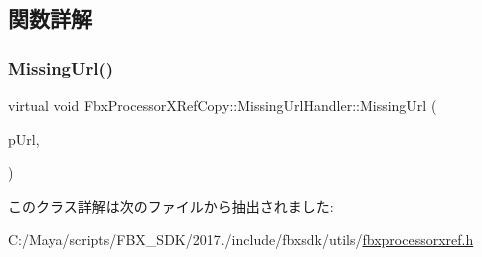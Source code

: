 \subsection{関数詳解}
\mbox{\label{class_fbx_processor_x_ref_copy_1_1_missing_url_handler_aa1ccc43ba9aecf2345e282e63bf722f2}} 
\subsubsection{\texorpdfstring{Missing\+Url()}{MissingUrl()}}
{\footnotesize\ttfamily virtual void Fbx\+Processor\+X\+Ref\+Copy\+::\+Missing\+Url\+Handler\+::\+Missing\+Url (\begin{DoxyParamCaption}\item[{const \hyperlink{class_fbx_string}{Fbx\+String} \&}]{p\+Url,  }\item[{const \hyperlink{class_fbx_property}{Fbx\+Property} \&}]{ }\end{DoxyParamCaption})\hspace{0.3cm}{\ttfamily [pure virtual]}}



このクラス詳解は次のファイルから抽出されました\+:\begin{DoxyCompactItemize}
\item 
C\+:/\+Maya/scripts/\+F\+B\+X\+\_\+\+S\+D\+K/2017./include/fbxsdk/utils/\hyperlink{fbxprocessorxref_8h}{fbxprocessorxref.\+h}\end{DoxyCompactItemize}

